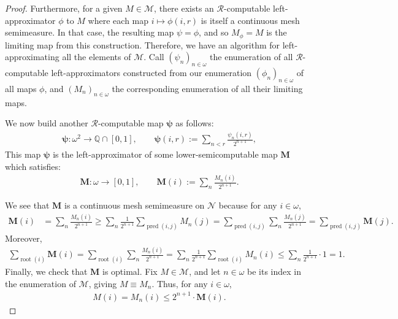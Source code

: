 \begin{proof}
    Furthermore, for a given $M \in \mathcal{M}$, there exists an $\mathscr{R}$-computable left-approximator $\phi$ to $M$ where each map $i \mapsto \phi(i, r)$ is itself a continuous mesh semimeasure. In that case, the resulting map $\psi = \phi$, and so $M_\phi = M$ is the limiting map from this construction. Therefore, we have an algorithm for left-approximating all the elements of $\mathcal{M}$. Call $(\psi_n)_{n \in \omega}$ the enumeration of all $\mathscr{R}$-computable left-approximators constructed from our enumeration $(\phi_n)_{n \in \omega}$ of all maps $\phi$, and $(M_n)_{n \in \omega}$ the corresponding enumeration of all their limiting maps. 

    We now build another $\mathscr{R}$-computable map $\boldsymbol{\psi}$ as follows:
    \begin{align*}
         \boldsymbol{\psi} : \omega^2 \to \mathbb{Q} \cap [0,1], \qquad \boldsymbol{\psi}(i, r) := \sum_{n < r} \frac{\psi_n(i, r)}{2^{n + 1}},
    \end{align*}
    This map $\boldsymbol{\psi}$ is the left-approximator of some lower-semicomputable map $\mathbf{M}$ which satisfies:
    \begin{align*}
        \mathbf{M}: \omega \to [0, 1], \qquad \mathbf{M}(i) := \sum_n \frac{M_n(i)}{2^{n + 1}}.
    \end{align*}
    
    We see that $\mathbf{M}$ is a continuous mesh semimeasure on $\mathcal{N}$ because for any $i \in \omega$,
    \begin{align*}
        \mathbf{M}(i) &= \sum_n \frac{M_n(i)}{2^{n + 1}} \geq \sum_n \frac{1}{2^{n + 1}} \sum_{\operatorname{pred}(i,j)} M_n(j) = \sum_{\operatorname{pred}(i, j)} \sum_n \frac{M_n(j)}{2^{n + 1}} = \sum_{\operatorname{pred}(i, j)} \mathbf{M}(j).
    \end{align*}
    Moreover,
    \begin{align*}
        \sum_{\operatorname{root}(i)} \mathbf{M}(i) = \sum_{\operatorname{root}(i)} \sum_n \frac{M_n(i)}{2^{n + 1}} = \sum_n \frac{1}{2^{n + 1}} \sum_{\operatorname{root}(i)} M_n(i) \leq \sum_n \frac{1}{2^{n+ 1}} \cdot 1 = 1.
    \end{align*}
    Finally, we check that $\mathbf{M}$ is optimal. Fix $M \in \mathcal{M}$, and let $n \in \omega$ be its index in the enumeration of $\mathcal{M}$, giving $M \equiv M_n$. Thus, for any $i \in \omega$,
    \begin{align*}
        M(i) = M_n(i) \leq 2^{n + 1} \cdot \mathbf{M}(i).
    \end{align*}
\end{proof}

